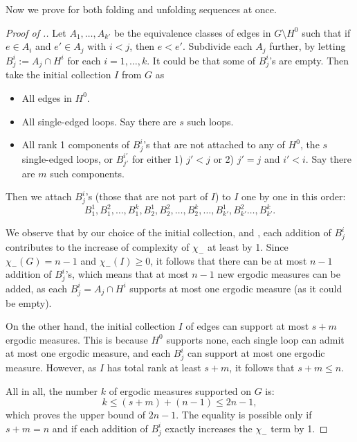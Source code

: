 \documentclass[11pt, letterpaper]{amsart}
\theoremstyle{plain}
\theoremstyle{definition}
\begin{document}
  Now we prove  for both folding and unfolding sequences at once.
  \begin{proof}[Proof of .]
    Let $A_1,\ldots,A_{k'}$ be the equivalence classes of edges in $G \setminus
    H^0$ such that if $e \in A_i$ and $e' \in A_j$ with $i<j$, then $e < e'$.
    Subdivide each $A_j$ further, by letting $B_j^i:= A_j \cap H^i$ for each
    $i=1,\ldots,k$. It could be that some of $B_j^i$'s are empty.
    Then take the initial collection $I$ from $G$ as
    \begin{itemize}
    \item All edges in $H^0$.
    \item All single-edged loops. Say there are $s$ such loops.
    \item All rank 1 components of $B_j^i$'s that are not attached to any of $H^0$, the $s$
  single-edged loops, or $B_{j'}^{i'}$ for either 1) $j'<j$ or 2) $j'=j$ and $
  i'<i$. Say there are $m$ such components.
\end{itemize}

Then we attach $B_j^i$'s (those that are not part of $I$) to $I$ one by one in this order:
\[
  B_{1}^1,B_1^2,\ldots,B_1^{k},B_2^1,B_2^2,\ldots,B_2^k,\ldots, B_{k'}^1,B_{k'}^2\ldots,B_{k'}^k.
  \]

  We observe that by our choice of the initial collection, and
  , each addition of
  $B_j^i$ contributes to the increase of complexity of
  $\chi_-$ at least by 1. Since $\chi_-(G)=n-1$ and $\chi_-(I) \ge 0$, it
  follows that there can be at most $n-1$ addition of $B_j^i$'s, which means
  that at most $n-1$ new ergodic measures can be added, as each $B_j^i = A_j\cap
  H^i$ supports at most one ergodic measure (as it could be empty).

  On the other hand, the initial collection $I$ of edges can support at most $s+m$
  ergodic measures. This is because $H^0$ supports none, each single loop can
  admit at most one ergodic measure, and each $B_j^i$ can support at most one
  ergodic measure. However, as $I$ has total rank at least $s+m$, it follows that $s+m
  \le n$.

  All in all, the number $k$ of ergodic measures supported on $G$ is:
  \[
    k \le (s+m) + (n-1) \le 2n-1,
  \]
  which proves the upper bound of $2n-1$. The equality is possible only
  if $s+m = n$ and if
  each addition of $B_j^i$ exactly increases the $\chi_-$ term by 1. \end{proof}
\end{document}
